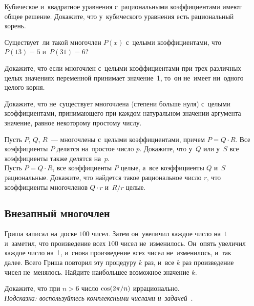 \begin{problems}

\item
Кубическое и~квадратное уравнения с~рациональными коэффициентами имеют общее
решение.
Докажите, что у~кубического уравнения есть рациональный корень.

\item
Существует~ли такой многочлен $P(x)$ с~целыми коэффициентами, что
$P(13) = 5$ и~$P(31) = 6$?

\item
Докажите, что если многочлен с~целыми коэффициентами при трех различных целых
значениях переменной принимает значение~1, то~он не~имеет ни~одного целого
корня.

\item
Докажите, что не~существует многочлена (степени больше нуля) с~целыми
коэффициентами, принимающего при каждом натуральном значении аргумента
значение, равное некоторому простому числу.

\item
{}%
\subproblem
Пусть $P$, $Q$, $R$~--- многочлены с~целыми коэффициентами, причем
$P = Q \cdot R$.
Все коэффициенты $P$ делятся на~простое число $p$.
Докажите, что у~$Q$ или у~$S$ все коэффициенты также делятся на~$p$.
\\
\subproblem
Пусть $P = Q \cdot R$, все коэффициенты $P$ целые, а~все коэффициенты $Q$ и~$S$
рациональные.
Докажите, что найдется такое рациональное число $r$, что коэффициенты
многочленов $Q \cdot r$ и~$R / r$ целые.

\end{problems}

\subsection*{Внезапный многочлен}

\begin{problems}

\item
Гриша записал на~доске $100$ чисел.
Затем он~увеличил каждое число на~$1$ и~заметил, что произведение всех
$100$ чисел не~изменилось.
Он~опять увеличил каждое число на~1, и~снова произведение всех чисел
не~изменилось, и~так далее.
Всего Гриша повторил эту процедуру $k$ раз, и~все $k$ раз произведение чисел
не~менялось.
Найдите наибольшее возможное значение $k$.

\item
Докажите, что при $n > 6$ число $\cos(2 \mathrm{\pi} / n)$ иррационально.
\\\emph{Подсказка: воспользуйтесь комплексными числами
и~задачей~.}

\end{problems}

\endgroup %

